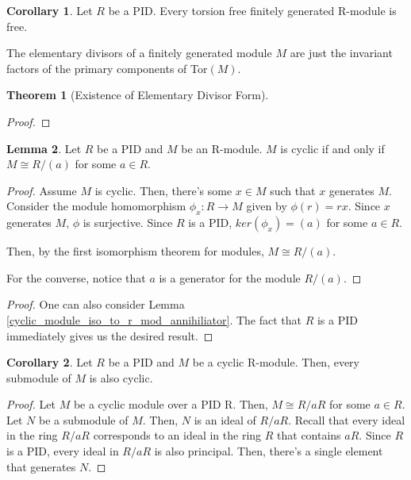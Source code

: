 \documentclass{article}
\theoremstyle{definition}
\newtheorem{theorem}{Theorem}[section]
\newtheorem{lemma}[theorem]{Lemma}
\newtheorem{corollary}{Corollary}[theorem]
\begin{document}
\begin{corollary}
    Let $R$ be a PID. Every torsion free finitely generated R-module is free.
\end{corollary}

The elementary divisors of a finitely generated module $M$ are just the invariant factors of the primary components of Tor$(M)$.

\begin{theorem}[Existence of Elementary Divisor Form]

    
\end{theorem}
\begin{proof}
    
\end{proof}

\begin{lemma}
    Let $R$ be a PID and $M$ be an R-module. $M$ is cyclic if and only if $M \cong R/(a)$ for some $a \in R$.
\end{lemma}
\begin{proof}
    Assume $M$ is cyclic. Then, there's some $x \in M$ such that $x$ generates $M$. Consider the module homomorphism $\phi_{x}: R \xrightarrow{} M$ given by $\phi(r) = rx$. Since $x$ generates $M$, $\phi$ is surjective. Since $R$ is a PID, $ker(\phi_{x}) = (a)$ for some $a \in R$.
    
    Then, by the first isomorphism theorem for modules, $M \cong R/(a)$. 

    For the converse, notice that $a$ is a generator for the module $R/(a)$.
\end{proof}
\begin{proof}
    One can also consider Lemma \ref{cyclic_module_iso_to_r_mod_annihiliator}. The fact that $R$ is a PID immediately gives us the desired result.
\end{proof}

\begin{corollary}
    Let $R$ be a PID and $M$ be a cyclic R-module. Then, every submodule of $M$ is also cyclic.
\end{corollary}
\begin{proof}
    Let $M$ be a cyclic module over a PID R. Then, $M \cong R/aR$ for some $a \in R$. Let $N$ be a submodule of $M$. Then, $N$ is an ideal of $R/aR$. Recall that every ideal in the ring $R/aR$ corresponds to an ideal in the ring $R$ that contains $aR$. Since $R$ is a PID, every ideal in $R/aR$ is also principal. Then, there's a single element that generates $N$.
\end{proof}
\end{document}
